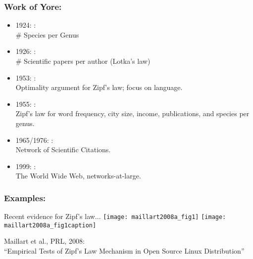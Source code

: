 \begin{frame}
  \frametitle{Work of Yore:}

  \begin{block}{}
    \begin{itemize}
    \item<1->
      1924: \cite{yule1924a}:\\ \# Species per Genus
    \item<2->
      1926: \cite{lotka1926a}:\\ \# Scientific papers per author (Lotka's law)
    \item<3->
      1953: \cite{mandelbrot1953a}:\\ Optimality argument
      for Zipf's law; focus on language.
    \item<4->
      1955: \cite{simon1955a,zipf1949a}:\\ Zipf's law for
      word frequency, city size, income, publications, and species per genus.
    \item<5->
      1965/1976: \cite{price1965a,price1976a}:\\ Network of Scientific Citations.
    \item <6->
      1999: \cite{barabasi1999a}:\\ The World Wide Web, networks-at-large.
    \end{itemize}
  \end{block}

\end{frame}

\begin{frame}
  \frametitle{Examples:}

  \begin{block}{Recent evidence for Zipf's law...}
    \texttt{[image: maillart2008a\_fig1]}
    \texttt{[image: maillart2008a\_fig1caption]}

    Maillart et al., PRL, 2008:\\
    ``Empirical Tests of {Z}ipf's Law Mechanism in 
    Open Source {L}inux Distribution''\cite{maillart2008a}
  \end{block}
  
\end{frame}

